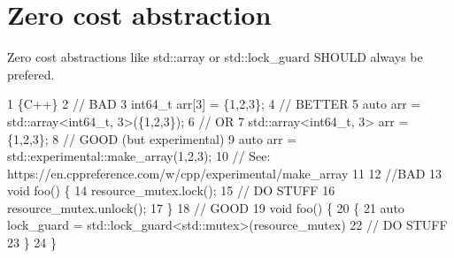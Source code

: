 \section*{Zero cost abstraction}

Zero cost abstractions like {\ttfamily std\+::array} or {\ttfamily std\+::lock\+\_\+guard} S\+H\+O\+U\+LD always be prefered. 
\begin{DoxyCode}
1 \{C++\}
2 // BAD
3 int64\_t arr[3] = \{1,2,3\};
4 // BETTER
5 auto arr = std::array<int64\_t, 3>(\{1,2,3\});
6 // OR
7 std::array<int64\_t, 3> arr = \{1,2,3\};
8 // GOOD (but experimental)
9 auto arr = std::experimental::make\_array(1,2,3);
10 // See: https://en.cppreference.com/w/cpp/experimental/make\_array
11 
12 //BAD
13 void foo() \{
14     resource\_mutex.lock();
15     // DO STUFF
16     resource\_mutex.unlock();
17 \}
18 // GOOD
19 void foo() \{
20     \{
21         auto lock\_guard = std::lock\_guard<std::mutex>(resource\_mutex)
22         // DO STUFF
23     \}
24 \}
\end{DoxyCode}
 